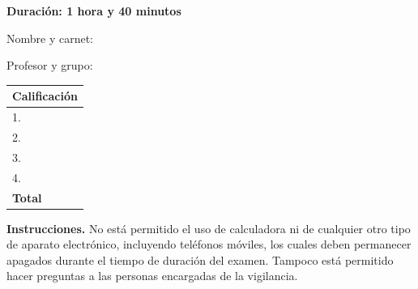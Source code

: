 \documentclass[11pt]{article}
\begin{document}
\examheader

\vspace{4pt}
\noindent
\begin{minipage}[t]{0.62\linewidth}
\textbf{Duración: 1 hora y 40 minutos}

\vspace{8pt}
Nombre y carnet: \dotfill

\vspace{6pt}
Profesor y grupo: \dotfill
\end{minipage}%
\hfill
\begin{minipage}[t]{0.32\linewidth}
\begin{tabular}{|l|c|}
\hline
\multicolumn{2}{|c|}{\textbf{Calificación}} \\ \hline
1. & \\ \hline
2. & \\ \hline
3. & \\ \hline
4. & \\ \hline
\textbf{Total} & \\ \hline
\end{tabular}
\end{minipage}

\vspace{6pt}
\noindent\textbf{Instrucciones.} No está permitido el uso de calculadora ni de cualquier otro tipo de aparato electrónico, incluyendo teléfonos móviles, los cuales deben permanecer apagados durante el tiempo de duración del examen. Tampoco está permitido hacer preguntas a las personas encargadas de la vigilancia.
\end{document}
